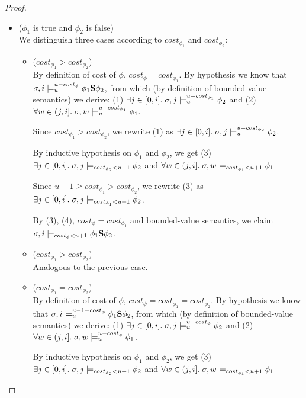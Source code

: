 \begin{theorem}
\begin{lemma}
\begin{proof}
\begin{itemize}
\begin{itemize}
        \item ($\phi_1$ is true and $\phi_2$ is false) \\
        We distinguish three cases according to $cost_{\phi_1}$ and $cost_{\phi_2}$:
        \begin{itemize}
            \item ($cost_{\phi_1} > cost_{\phi_2}$) \\
            By definition of cost of $\phi$, $cost_\phi = cost_{\phi_1}$.
            By hypothesis we know that $\sigma,i \models_{u}^{u-cost_\phi} \phi_1 \mathbf{S} \phi_2$, from which (by definition of bounded-value semantics) we derive: 
            (1) $\exists j \in [0,i].\; \sigma,j \models_{u}^{u-cost_{\phi_1}} \phi_2$ and 
            (2) $\forall w \in (j,i].\; \sigma,w \models_{u}^{u-cost_{\phi_1}} \phi_1$.

            Since $cost_{\phi_1} > cost_{\phi_2}$, we rewrite (1) as $\exists j \in [0,i].\; \sigma,j \models_{u}^{u-cost_{\phi_2}} \phi_2$.

            By inductive hypothesis on $\phi_1$ and $\phi_2$, we get (3) $\exists j \in [0,i].\; \sigma,j \models_{cost_{\phi_2} < u + 1} \phi_2$ and $\forall w \in (j,i].\; \sigma,w \models_{cost_{\phi_1} < u + 1} \phi_1$

            Since $u-1 \geq cost_{\phi_1} > cost_{\phi_2}$, we rewrite (3) as $\exists j \in [0,i].\; \sigma,j \models_{cost_{\phi_1} < u + 1} \phi_2$.

            By (3), (4), $cost_\phi = cost_{\phi_1}$ and bounded-value semantics, we claim $\sigma,i \models_{cost_\phi < u + 1} \phi_1 \mathbf{S} \phi_2$.

            \item ($cost_{\phi_1} > cost_{\phi_2}$) \\
            Analogous to the previous case.

            \item ($cost_{\phi_1} = cost_{\phi_2}$) \\
            By definition of cost of $\phi$, $cost_\phi = cost_{\phi_1} = cost_{\phi_2}$.
            By hypothesis we know that $\sigma,i \models_{u}^{u-1-cost_\phi} \phi_1 \mathbf{S} \phi_2$, from which (by definition of bounded-value semantics) we derive: 
            (1) $\exists j \in [0,i].\; \sigma,j \models_{u}^{u-cost_\phi} \phi_2$ and 
            (2) $\forall w \in (j,i].\; \sigma,w \models_{u}^{u-cost_\phi} \phi_1$.

            By inductive hypothesis on $\phi_1$ and $\phi_2$, we get (3) $\exists j \in [0,i].\; \sigma,j \models_{cost_{\phi_2} < u + 1} \phi_2$ and $\forall w \in (j,i].\; \sigma,w \models_{cost_{\phi_1} < u + 1} \phi_1$


\end{itemize}
\end{itemize}
\end{itemize}
\end{proof}
\end{lemma}
\end{theorem}
